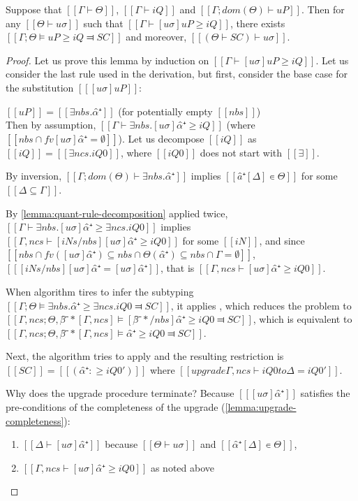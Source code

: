 \begin{lemma} \label{lemma:pos-subt-completeness}
    Suppose that $[[Γ ⊢ Θ]]$, $[[Γ ⊢ iQ]]$ and $[[Γ ; dom(Θ) ⊢  uP]]$.
    Then for any $[[Θ ⊢ uσ]]$ such that $[[ Γ ⊢ [uσ]uP ≥ iQ ]]$,
    there exists $[[Γ; Θ ⊨ uP ≥ iQ ⫤ SC]]$ and moreover, $[[(Θ  ⊢  SC) ⊢ uσ]]$.
\end{lemma}
\begin{proof}
    Let us prove this lemma by induction on $[[ Γ ⊢ [uσ]uP ≥ iQ ]]$.
    Let us consider the last rule used in the derivation,
    but first, consider the base case for the substitution $[[ [uσ]uP ]]$:
    \begin{caseof}
        \item \label{case:pos-subt-complete-base} $[[uP]] = [[ ∃nbs.α̂⁺ ]]$ 
            (for potentially empty $[[nbs]]$)\\
            Then by assumption, $[[ Γ ⊢ ∃nbs.[uσ]α̂⁺ ≥ iQ ]]$ (where $[[ {nbs} ∩ fv [uσ]α̂⁺ = ∅]]$).
            Let us decompose $[[iQ]]$ as $[[iQ]] = [[∃ncs.iQ0]]$, where $[[iQ0]]$ does
            not start with $[[∃]]$. 

            By inversion, $[[Γ ; dom(Θ) ⊢  ∃nbs.α̂⁺]]$ implies $[[â⁺[Δ] ∊ Θ]]$ for some 
            $[[{Δ} ⊆ {Γ}]]$.

            By \cref{lemma:quant-rule-decomposition} applied twice, 
            $[[ Γ ⊢ ∃nbs.[uσ]α̂⁺ ≥ ∃ncs.iQ0 ]]$ implies
            $[[ Γ,ncs  ⊢ [iNs/nbs][uσ]α̂⁺ ≥ iQ0 ]]$ for some $[[iN]]$, 
            and since $[[ {nbs} ∩ fv([uσ]α̂⁺) ⊆ {nbs} ∩ {Θ(α̂⁺)} ⊆ {nbs} ∩ {Γ} = ∅ ]]$,
            $[[ [iNs/nbs][uσ]α̂⁺ = [uσ]α̂⁺ ]]$, that is $[[ Γ,ncs ⊢ [uσ]α̂⁺ ≥ iQ0]]$.

            When algorithm tires to infer the subtyping 
            $[[Γ; Θ ⊨ ∃nbs.α̂⁺ ≥ ∃ncs.iQ0 ⫤ SC]]$,
            it applies ,
            which reduces the problem to
            $[[Γ, ncs; Θ, β̂⁻*[Γ, ncs] ⊨ [β̂⁻*/nbs] α̂⁺ ≥ iQ0 ⫤ SC]]$, 
            which is equivalent to 
            $[[Γ, ncs; Θ, β̂⁻*[Γ, ncs] ⊨ α̂⁺ ≥ iQ0 ⫤ SC]]$.

            Next, the algorithm tries to apply
            and the resulting restriction is $[[SC]] = [[(α̂⁺ :≥ iQ0')]]$ where
            $[[upgrade Γ, ncs ⊢ iQ0 to Δ = iQ0']]$.

            Why does the upgrade procedure terminate?
            Because $[[ [uσ]α̂⁺ ]]$ satisfies the pre-conditions of the completeness of the upgrade
            (\cref{lemma:upgrade-completeness}):
            \begin{enumerate}
                \item $[[Δ ⊢ [uσ]α̂⁺ ]]$ because $[[Θ ⊢ uσ]]$ and $[[α̂⁺[Δ] ∊ Θ]]$,
                \item $[[ Γ,ncs ⊢ [uσ]α̂⁺ ≥ iQ0]]$ as noted above
            \end{enumerate}


\end{caseof}
\end{proof}
